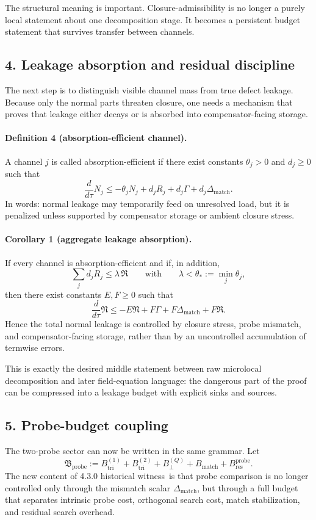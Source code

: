 \documentclass[12pt,a4paper]{article}
\newcommand{\docversion}{4.3.0 historical witness}
\begin{document}
The structural meaning is important. Closure-admissibility is no longer a purely
local statement about one decomposition stage. It becomes a persistent budget
statement that survives transfer between channels.

\subsection*{4. Leakage absorption and residual discipline}
The next step is to distinguish visible channel mass from true defect leakage.
Because only the normal parts threaten closure, one needs a mechanism that proves
that leakage either decays or is absorbed into compensator-facing storage.

\paragraph{Definition 4 (absorption-efficient channel).}
A channel $j$ is called absorption-efficient if there exist constants
$\theta_j>0$ and $d_j\ge0$ such that
\[
\frac{d}{d\tau}N_j
\le -\theta_j N_j + d_j R_j + d_j\Gamma + d_j\Delta_{\mathrm{match}}.
\]
In words: normal leakage may temporarily feed on unresolved load, but it is
penalized unless supported by compensator storage or ambient closure stress.

\paragraph{Corollary 1 (aggregate leakage absorption).}
If every channel is absorption-efficient and if, in addition,
\[
\sum_j d_j R_j \le \lambda\,\mathfrak R
\qquad\text{with}\qquad
\lambda<\theta_*:=\min_j\theta_j,
\]
then there exist constants $E,F\ge0$ such that
\[
\frac{d}{d\tau}\mathfrak N
\le -E\mathfrak N + F\Gamma + F\Delta_{\mathrm{match}} + F\mathfrak R.
\]
Hence the total normal leakage is controlled by closure stress, probe mismatch,
and compensator-facing storage, rather than by an uncontrolled accumulation of
termwise errors.

This is exactly the desired middle statement between raw microlocal decomposition
and later field-equation language: the dangerous part of the proof can be
compressed into a leakage budget with explicit sinks and sources.

\subsection*{5. Probe-budget coupling}
The two-probe sector can now be written in the same grammar. Let
\[
\mathfrak B_{\mathrm{probe}}:=
B_{\mathrm{tri}}^{(1)}+B_{\mathrm{tri}}^{(2)}+B_{\perp}^{(Q)}+B_{\mathrm{match}}+B_{\mathrm{res}}^{\mathrm{probe}}.
\]
The new content of \docversion\ is that probe comparison is no longer controlled
only through the mismatch scalar $\Delta_{\mathrm{match}}$, but through a full budget
that separates intrinsic probe cost, orthogonal search cost, match stabilization,
and residual search overhead.
\end{document}

